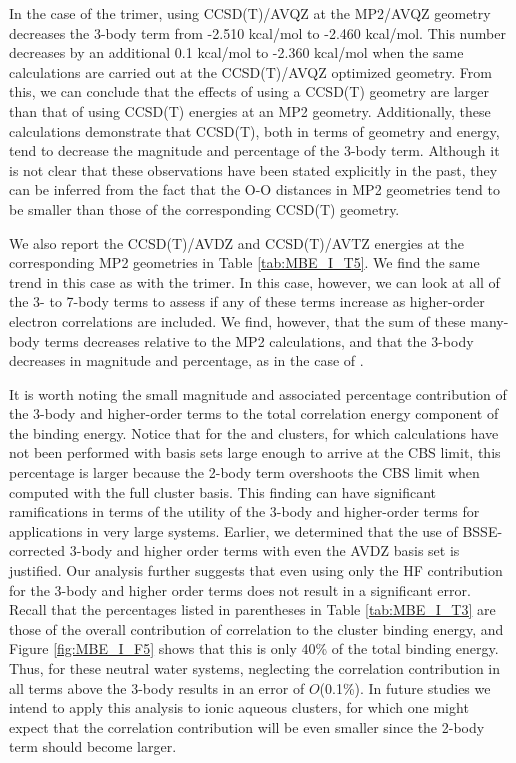 \documentclass[11pt, proquest]{uwthesis}[2020/02/24]
\let\ce\ch
\newcommand{\textapprox}{\raisebox{0.5ex}{\texttildelow}}
\begin{document}
\par In the case of the trimer, using CCSD(T)/AVQZ at the MP2/AVQZ geometry decreases the 3-body term from -2.510 kcal/mol to -2.460 kcal/mol. This number decreases by an additional 0.1 kcal/mol to -2.360 kcal/mol when the same calculations are carried out at the CCSD(T)/AVQZ optimized geometry. From this, we can conclude that the effects of using a CCSD(T) geometry are larger than that of using CCSD(T) energies at an MP2 geometry. Additionally, these calculations demonstrate that CCSD(T), both in terms of geometry and energy, tend to decrease the magnitude and percentage of the 3-body term. Although it is not clear that these observations have been stated explicitly in the past, they can be inferred from the fact that the O-O distances in MP2 geometries tend to be smaller than those of the corresponding CCSD(T) geometry\autocite{miliordos_optimal_2013}.

\par We also report the CCSD(T)/AVDZ and CCSD(T)/AVTZ energies at the corresponding MP2 geometries in Table \ref{tab:MBE_I_T5}. We find the same trend in this case as with the trimer. In this case, however, we can look at all of the 3- to 7-body terms to assess if any of these terms increase as higher-order electron correlations are included. We find, however, that the sum of these many-body terms decreases relative to the MP2 calculations, and that the 3-body decreases in magnitude and percentage, as in the case of \ce{(H2O)3}.

\par It is worth noting the small magnitude and associated percentage contribution of the 3-body and higher-order terms to the total correlation energy component of the binding energy. Notice that for the \ce{(H2O)_{13}} and \ce{(H2O)_{16}} clusters, for which calculations have not been performed with basis sets large enough to arrive at the CBS limit, this percentage is larger because the 2-body term overshoots the CBS limit when computed with the full cluster basis. This finding can have significant ramifications in terms of the utility of the 3-body and higher-order terms for applications in very large systems. Earlier, we determined that the use of BSSE-corrected 3-body and higher order terms with even the AVDZ basis set is justified. Our analysis further suggests that even using only the HF contribution for the 3-body and higher order terms does not result in a significant error. Recall that the percentages listed in parentheses in Table \ref{tab:MBE_I_T3} are those of the overall contribution of correlation to the cluster binding energy, and Figure \ref{fig:MBE_I_F5} shows that this is only \textapprox40\% of the total binding energy. Thus, for these neutral water systems, neglecting the correlation contribution in all terms above the 3-body results in an error of $O$(0.1\%). In future studies we intend to apply this analysis to ionic aqueous clusters, for which one might expect that the correlation contribution will be even smaller since the 2-body term should become larger.
\end{document}
